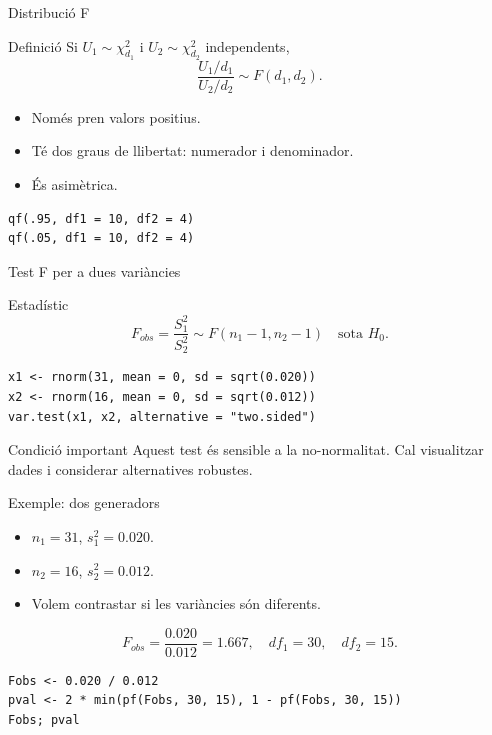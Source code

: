 \documentclass[10pt,aspectratio=169]{beamer}
\begin{document}
\begin{frame}[fragile]{Distribució F}
\begin{block}{Definició}
Si $U_1\sim\chi^2_{d_1}$ i $U_2\sim\chi^2_{d_2}$ independents,
\[
\frac{U_1/d_1}{U_2/d_2}\sim F(d_1,d_2).
\]
\end{block}
\begin{itemize}
  \item Només pren valors positius.
  \item Té dos graus de llibertat: numerador i denominador.
  \item És asimètrica.
\end{itemize}
\begin{lstlisting}
qf(.95, df1 = 10, df2 = 4)
qf(.05, df1 = 10, df2 = 4)
\end{lstlisting}
\end{frame}

\begin{frame}[fragile]{Test F per a dues variàncies}
\begin{block}{Estadístic}
\[
F_{obs}=\frac{S_1^2}{S_2^2}\sim F(n_1-1,n_2-1)
\quad \text{sota }H_0.
\]
\end{block}
\begin{lstlisting}
x1 <- rnorm(31, mean = 0, sd = sqrt(0.020))
x2 <- rnorm(16, mean = 0, sd = sqrt(0.012))
var.test(x1, x2, alternative = "two.sided")
\end{lstlisting}
\begin{alertblock}{Condició important}
Aquest test és sensible a la no-normalitat. Cal visualitzar dades i considerar alternatives robustes.
\end{alertblock}
\end{frame}

\begin{frame}[fragile]{Exemple: dos generadors}
\begin{itemize}
  \item $n_1=31$, $s_1^2=0.020$.
  \item $n_2=16$, $s_2^2=0.012$.
  \item Volem contrastar si les variàncies són diferents.
\end{itemize}
\[
F_{obs}=\frac{0.020}{0.012}=1.667,
\quad df_1=30,
\quad df_2=15.
\]
\begin{lstlisting}
Fobs <- 0.020 / 0.012
pval <- 2 * min(pf(Fobs, 30, 15), 1 - pf(Fobs, 30, 15))
Fobs; pval
\end{lstlisting}
\end{frame}
\end{document}
